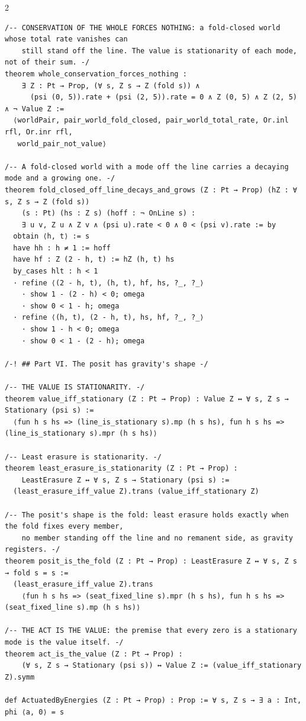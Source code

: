 \documentclass[10pt]{article}
\begin{document}
\begin{multicols}{2}
\begin{Verbatim}[fontsize=\fontsize{6.2}{7.2}\selectfont,breaklines,breakanywhere,breaksymbolleft={}]
/-- CONSERVATION OF THE WHOLE FORCES NOTHING: a fold-closed world whose total rate vanishes can
    still stand off the line. The value is stationarity of each mode, not of their sum. -/
theorem whole_conservation_forces_nothing :
    ∃ Z : Pt → Prop, (∀ s, Z s → Z (fold s)) ∧
      (psi (0, 5)).rate + (psi (2, 5)).rate = 0 ∧ Z (0, 5) ∧ Z (2, 5) ∧ ¬ Value Z :=
  ⟨worldPair, pair_world_fold_closed, pair_world_total_rate, Or.inl rfl, Or.inr rfl,
   world_pair_not_value⟩

/-- A fold-closed world with a mode off the line carries a decaying mode and a growing one. -/
theorem fold_closed_off_line_decays_and_grows (Z : Pt → Prop) (hZ : ∀ s, Z s → Z (fold s))
    (s : Pt) (hs : Z s) (hoff : ¬ OnLine s) :
    ∃ u v, Z u ∧ Z v ∧ (psi u).rate < 0 ∧ 0 < (psi v).rate := by
  obtain ⟨h, t⟩ := s
  have hh : h ≠ 1 := hoff
  have hf : Z (2 - h, t) := hZ (h, t) hs
  by_cases hlt : h < 1
  · refine ⟨(2 - h, t), (h, t), hf, hs, ?_, ?_⟩
    · show 1 - (2 - h) < 0; omega
    · show 0 < 1 - h; omega
  · refine ⟨(h, t), (2 - h, t), hs, hf, ?_, ?_⟩
    · show 1 - h < 0; omega
    · show 0 < 1 - (2 - h); omega

/-! ## Part VI. The posit has gravity's shape -/

/-- THE VALUE IS STATIONARITY. -/
theorem value_iff_stationary (Z : Pt → Prop) : Value Z ↔ ∀ s, Z s → Stationary (psi s) :=
  ⟨fun h s hs => (line_is_stationary s).mp (h s hs), fun h s hs => (line_is_stationary s).mpr (h s hs)⟩

/-- Least erasure is stationarity. -/
theorem least_erasure_is_stationarity (Z : Pt → Prop) :
    LeastErasure Z ↔ ∀ s, Z s → Stationary (psi s) :=
  (least_erasure_iff_value Z).trans (value_iff_stationary Z)

/-- The posit's shape is the fold: least erasure holds exactly when the fold fixes every member,
    no member standing off the line and no remanent side, as gravity registers. -/
theorem posit_is_the_fold (Z : Pt → Prop) : LeastErasure Z ↔ ∀ s, Z s → fold s = s :=
  (least_erasure_iff_value Z).trans
    ⟨fun h s hs => (seat_fixed_line s).mpr (h s hs), fun h s hs => (seat_fixed_line s).mp (h s hs)⟩

/-- THE ACT IS THE VALUE: the premise that every zero is a stationary mode is the value itself. -/
theorem act_is_the_value (Z : Pt → Prop) :
    (∀ s, Z s → Stationary (psi s)) ↔ Value Z := (value_iff_stationary Z).symm

def ActuatedByEnergies (Z : Pt → Prop) : Prop := ∀ s, Z s → ∃ a : Int, phi ⟨a, 0⟩ = s


\end{Verbatim}
\end{multicols}
\end{document}
